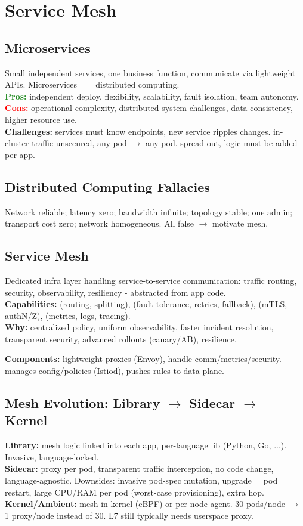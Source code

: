 \section{Service Mesh}
\subsection{Microservices}
Small independent services, one business function, communicate via lightweight APIs. Microservices == distributed computing. \\
\textcolor{ForestGreen}{\textbf{Pros:}} independent deploy, flexibility, scalability, fault isolation, team autonomy. \\
\textcolor{red}{\textbf{Cons:}} operational complexity, distributed-system challenges, data consistency, higher resource use. \\
\textbf{Challenges:}  services must know endpoints, new service ripples changes.  in-cluster traffic unsecured, any pod $\to$ any pod.  spread out, logic must be added per app.

\subsection{Distributed Computing Fallacies}
Network reliable; latency zero; bandwidth infinite; topology stable; one admin; transport cost zero; network homogeneous. All false $\to$ motivate mesh.

\subsection{Service Mesh}
Dedicated infra layer handling service-to-service communication: traffic routing, security, observability, resiliency - abstracted from app code. \\
\textbf{Capabilities:}  (routing, splitting),  (fault tolerance, retries, fallback),  (mTLS, authN/Z),  (metrics, logs, tracing). \\
\textbf{Why:} centralized policy, uniform observability, faster incident resolution, transparent security, advanced rollouts (canary/AB), resilience.

\textbf{Components:}  lightweight proxies (Envoy), handle comm/metrics/security.  manages config/policies (Istiod), pushes rules to data plane.

\subsection{Mesh Evolution: Library $\to$ Sidecar $\to$ Kernel}
\textbf{Library:} mesh logic linked into each app, per-language lib (Python, Go, ...). Invasive, language-locked. \\
\textbf{Sidecar:} proxy per pod, transparent traffic interception, no code change, language-agnostic. Downsides: invasive pod-spec mutation, upgrade = pod restart, large CPU/RAM per pod (worst-case provisioning), extra hop. \\
\textbf{Kernel/Ambient:} mesh in kernel (eBPF) or per-node agent. 30 pods/node $\to$ 1 proxy/node instead of 30. L7 still typically needs userspace proxy.


